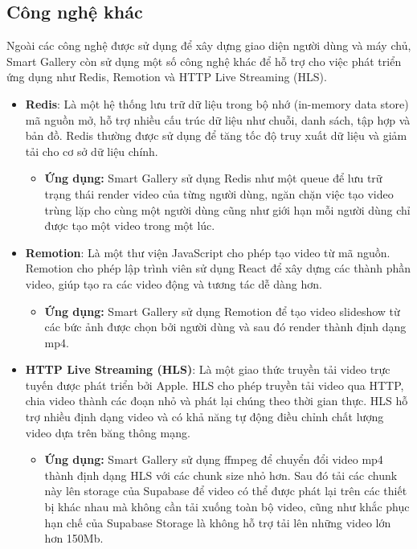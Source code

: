 \subsection{Công nghệ khác}

Ngoài các công nghệ được sử dụng để xây dựng giao diện người dùng và máy chủ, Smart Gallery còn sử dụng một số công nghệ khác để hỗ trợ cho việc phát triển ứng dụng như Redis, Remotion và HTTP Live Streaming (HLS).
\begin{itemize}
    \item \textbf{Redis}\cite{redisdoc}: Là một hệ thống lưu trữ dữ liệu trong bộ nhớ (in-memory data store) mã nguồn mở, hỗ trợ nhiều cấu trúc dữ liệu như chuỗi, danh sách, tập hợp và bản đồ. Redis thường được sử dụng để tăng tốc độ truy xuất dữ liệu và giảm tải cho cơ sở dữ liệu chính.
    \begin{itemize}
        \item \textbf{Ứng dụng:} Smart Gallery sử dụng Redis như một queue để lưu trữ trạng thái render video của từng người dùng, ngăn chặn việc tạo video trùng lặp cho cùng một người dùng cũng như giới hạn mỗi người dùng chỉ được tạo một video trong một lúc.
    \end{itemize}
    
    \item \textbf{Remotion}\cite{remotion}: Là một thư viện JavaScript cho phép tạo video từ mã nguồn. Remotion cho phép lập trình viên sử dụng React để xây dựng các thành phần video, giúp tạo ra các video động và tương tác dễ dàng hơn.
    \begin{itemize}
        \item \textbf{Ứng dụng:} Smart Gallery sử dụng Remotion để tạo video slideshow từ các bức ảnh được chọn bởi người dùng và sau đó render thành định dạng mp4.
    \end{itemize}
    
    \item \textbf{HTTP Live Streaming (HLS)}\cite{hls}: Là một giao thức truyền tải video trực tuyến được phát triển bởi Apple. HLS cho phép truyền tải video qua HTTP, chia video thành các đoạn nhỏ và phát lại chúng theo thời gian thực. HLS hỗ trợ nhiều định dạng video và có khả năng tự động điều chỉnh chất lượng video dựa trên băng thông mạng.
    \begin{itemize}
        \item \textbf{Ứng dụng:} Smart Gallery sử dụng ffmpeg\cite{ffmpeg} để chuyển đổi video mp4 thành định dạng HLS với các chunk size nhỏ hơn. Sau đó tải các chunk này lên storage của Supabase để video có thể được phát lại trên các thiết bị khác nhau mà không cần tải xuống toàn bộ video, cũng như khắc phục hạn chế của Supabase Storage là không hỗ trợ tải lên những video lớn hơn 150Mb.
    \end{itemize}
\end{itemize}